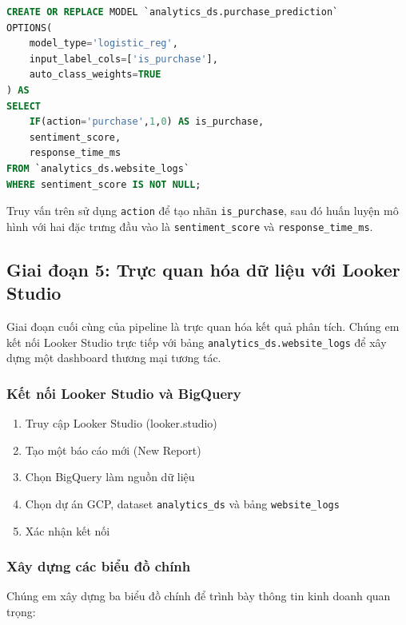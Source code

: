 \begin{lstlisting}[language=SQL, frame=none]
CREATE OR REPLACE MODEL `analytics_ds.purchase_prediction`
OPTIONS(
    model_type='logistic_reg',
    input_label_cols=['is_purchase'],
    auto_class_weights=TRUE
) AS
SELECT
    IF(action='purchase',1,0) AS is_purchase,
    sentiment_score,
    response_time_ms
FROM `analytics_ds.website_logs`
WHERE sentiment_score IS NOT NULL;
\end{lstlisting}

Truy vấn trên sử dụng \texttt{action} để tạo nhãn \texttt{is\_purchase}, sau đó huấn luyện mô hình với hai đặc trưng đầu vào là \texttt{sentiment\_score} và \texttt{response\_time\_ms}.

\subsection{Giai đoạn 5: Trực quan hóa dữ liệu với Looker Studio}

Giai đoạn cuối cùng của pipeline là trực quan hóa kết quả phân tích. Chúng em kết nối Looker Studio trực tiếp với bảng \texttt{analytics\_ds.website\_logs} để xây dựng một dashboard thương mại tương tác.

\subsubsection*{Kết nối Looker Studio và BigQuery}

\begin{enumerate}
    \item Truy cập Looker Studio (looker.studio)
    \item Tạo một báo cáo mới (New Report)
    \item Chọn BigQuery làm nguồn dữ liệu
    \item Chọn dự án GCP, dataset \texttt{analytics\_ds} và bảng \texttt{website\_logs}
    \item Xác nhận kết nối
\end{enumerate}

\subsubsection*{Xây dựng các biểu đồ chính}

Chúng em xây dựng ba biểu đồ chính để trình bày thông tin kinh doanh quan trọng:

